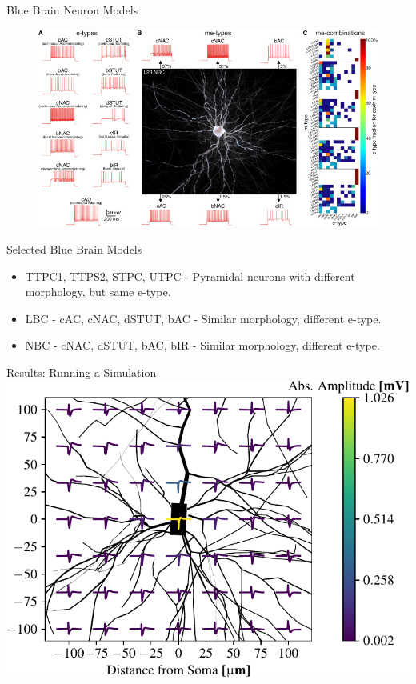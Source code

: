 \documentclass{beamer}
\begin{document}
\begin{frame}{Blue Brain Neuron Models}
    \begin{figure}
        \centering
        \includegraphics[width=\textwidth]{images/e-types.jpg}\\
    \end{figure}
\end{frame}

\begin{frame}{Selected Blue Brain Models}
    \begin{itemize}
        \item TTPC1, TTPS2, STPC, UTPC - Pyramidal neurons with different morphology, 
            but same e-type.
        \item LBC - cAC, cNAC, dSTUT, bAC - Similar morphology, different e-type.
        \item NBC - cNAC, dSTUT, bAC, bIR - Similar morphology, different e-type.
    \end{itemize}
\end{frame}

\begin{frame}{Results: Running a Simulation}
    \centering
    \includegraphics[width=\textwidth]{images/grid_y_x_signals_2d_normalized.pdf}
\end{frame}
\end{document}
